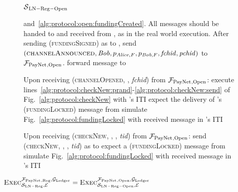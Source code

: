 \begin{figure}[H]
\begin{simulatorbox}{$\mathcal{S}{}_{\mathrm{LN - Reg - Open}}$}
\begin{algorithmic}[1]
            and~\ref{alg:protocol:open:fundingCreated}.
            All messages should be handed to and received from \adversary, as in
            the real world execution.
            \State After sending (\textsc{fundingSigned}) as \bob{} to \alice,
            send $\left(\textsc{channelAnnounced}, \mathit{Bob}, p_{\mathit{Alice}, F}, p_{\mathit{Bob},
            F}, \mathit{fchid}, \mathit{pchid}\right)$ to $\mathcal{F}_{\mathrm{PayNet}}{}_{\mathrm{,
            Open}}$.
            \label{alg:sim:open:announced:bob:bobhonest}
            \State forward message to \adversary{} 
          \EndIf
        \EndIndent
        \Statex

        \State Upon receiving (\textsc{channelOpened}, \alice, \textit{fchid})
        from $\mathcal{F}_{\mathrm{PayNet}}{}_{\mathrm{, Open}}$:
        \Indent
          \State execute
          lines~\ref{alg:protocol:checkNew:prand}-\ref{alg:protocol:checkNew:send}
          of Fig.~\ref{alg:protocol:checkNew} with \alice's ITI
            \State expect the delivery of \alice's (\textsc{fundingLocked})
            message from \adversary
            \State simulate Fig.~\ref{alg:protocol:fundingLocked} with
            received message in \bob's ITI
          \EndIf
        \EndIndent
        \Statex

        \State Upon receiving (\textsc{checkNew}, \alice, \bob, \textit{tid})
        from $\mathcal{F}_{\mathrm{PayNet}}{}_{\mathrm{, Open}}$: 
        \Indent
          \State send (\textsc{checkNew}, \alice, \bob, \textit{tid}) as
          \environment{} to \adversary
            \State expect a (\textsc{fundingLocked}) message from \adversary
            \State simulate Fig.~\ref{alg:protocol:fundingLocked} with
            received message in \bob's ITI
          \EndIf
        \EndIndent
      \end{algorithmic}
    \end{simulatorbox}
    \caption{}
    \label{alg:sim:open}
  \end{figure}

  \begin{lemma}
    \label{lemma:open}
    $\textsc{Exec}^{\mathcal{F}_{\mathrm{PayNet}}{}_{\mathrm{, Reg}},
    \mathcal{G}_{\mathrm{Ledger}}}_{\mathcal{S}_{\mathrm{LN - Reg}}, \mathcal{E}} =
    \textsc{Exec}^{\mathcal{F}_{\mathrm{PayNet}}{}_{\mathrm{, Open}},
    \mathcal{G}_{\mathrm{Ledger}}}_{\mathcal{S}_{\mathrm{LN - Reg - Open}}, \mathcal{E}}$
  \end{lemma}

